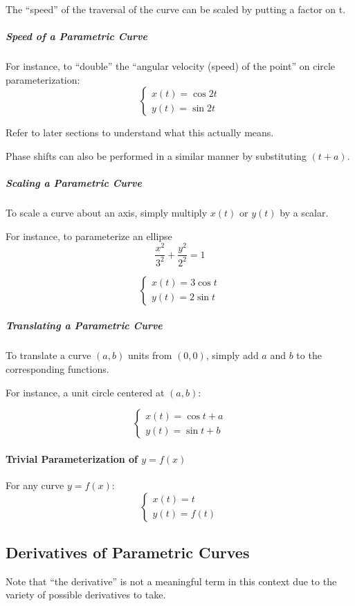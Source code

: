 \documentclass{article}
\begin{document}
The ``speed'' of the traversal of the curve can be scaled by putting a factor on t.

\subparagraph{Speed of a Parametric Curve}
For instance, to ``double'' the ``angular velocity (speed) of the point'' on circle parameterization:
\[
    \begin{cases}
        x(t) = \cos 2t \\
        y(t) = \sin 2t
    \end{cases}
\]

Refer to later sections to understand what this actually means.

Phase shifts can also be performed in a similar manner by substituting $(t+a)$.

\subparagraph{Scaling a Parametric Curve}
To scale a curve about an axis, simply multiply $x(t)$ or $y(t)$ by a scalar.

For instance, to parameterize an ellipse
$$\frac{x^2}{3^2} + \frac{y^2}{2^2} = 1$$

\[
    \begin{cases}
        x(t) = 3 \cos t \\
        y(t) = 2 \sin t
    \end{cases}
\]

\subparagraph{Translating a Parametric Curve}
To translate a curve $(a,b)$ units from $(0,0)$, simply add $a$ and $b$ to the corresponding functions.

For instance, a unit circle centered at $(a,b)$:

\[
    \begin{cases}
        x(t) = \cos t + a \\
        y(t) = \sin t + b
    \end{cases}
\]

\paragraph{Trivial Parameterization of $y=f(x)$}
For any curve $y = f(x)$:
\[
    \begin{cases}
        x(t) = t \\
        y(t) = f(t)
    \end{cases}
\]

\subsection{Derivatives of Parametric Curves}
Note that ``the derivative'' is not a meaningful term in this context due to the variety of possible derivatives to take.
\end{document}
